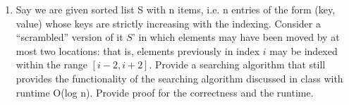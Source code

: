 \documentclass{common/cs157}
\begin{document}
\newpage

\begin{problem}{3}
\begin{enumerate}
    \item Say we are given sorted list S with n items, i.e. n entries of the form (key, value) whose keys are strictly increasing with the indexing. Consider a “scrambled” version of it $S’$ in which elements may have been moved by at most two locations: that is, elements previously in index $i$ may be indexed within the range $[i-2, i+2]$. Provide a searching algorithm that still provides the functionality of the searching algorithm discussed in class with runtime O(log n). Provide proof for the correctness and the runtime.
\end{enumerate}
\end{problem}
\end{document}

